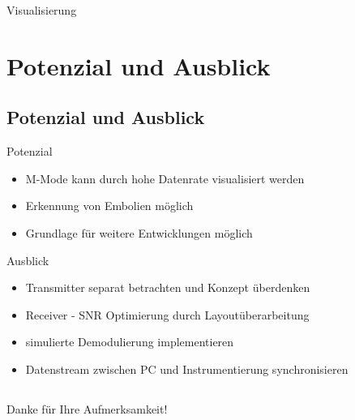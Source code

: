 \documentclass{beamer}
\newcommand*\tick{\item[\Checkmark]}
\newcommand*\fail{\item[\XSolidBrush]}
\begin{document}
\begin{frame}{Visualisierung}
  \begin{figure}[h!]
  \centering
	\hspace{1mm}
  \end{figure}
\end{frame}

\section{Potenzial und Ausblick}
\subsection*{Potenzial und Ausblick}
\begin{frame}
	\begin{block}{Potenzial}
	\begin{itemize}
		\item M-Mode kann durch hohe Datenrate visualisiert werden
		\item Erkennung von Embolien möglich
		\item Grundlage für weitere Entwicklungen möglich 
	\end{itemize}	
	\end{block}
	\begin{block}{Ausblick}
	\begin{itemize}
		\item Transmitter separat betrachten und Konzept überdenken
		\item Receiver - SNR Optimierung durch Layoutüberarbeitung %
		\item simulierte Demodulierung implementieren
		\item Datenstream zwischen PC und Instrumentierung synchronisieren
	\end{itemize}
	\end{block}
\end{frame}

\subsection*{}
\begin{frame}
Danke für Ihre Aufmerksamkeit!
\end{frame}
\end{document}
